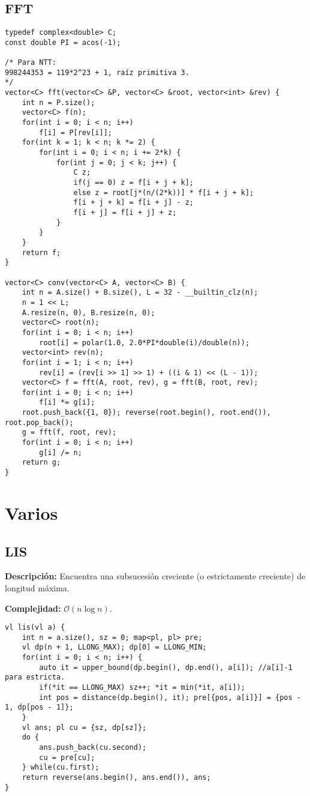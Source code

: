 \documentclass[twocolumn]{article}
\begin{document}
\subsection{FFT}
\lstset{basicstyle=\footnotesize\ttfamily,breaklines=true,tabsize=2,language=C++,frame=leftline, numbers=left, numberstyle=\tiny, numbersep=5pt}
\begin{lstlisting}
typedef complex<double> C;
const double PI = acos(-1);

/* Para NTT:
998244353 = 119*2^23 + 1, raíz primitiva 3.
*/
vector<C> fft(vector<C> &P, vector<C> &root, vector<int> &rev) {
	int n = P.size();
	vector<C> f(n);
	for(int i = 0; i < n; i++)
		f[i] = P[rev[i]];
	for(int k = 1; k < n; k *= 2) {
		for(int i = 0; i < n; i += 2*k) {
			for(int j = 0; j < k; j++) {
				C z;
				if(j == 0) z = f[i + j + k]; 
				else z = root[j*(n/(2*k))] * f[i + j + k];
				f[i + j + k] = f[i + j] - z;
				f[i + j] = f[i + j] + z;
			}
		}
	}
	return f;
}

vector<C> conv(vector<C> A, vector<C> B) {
	int n = A.size() + B.size(), L = 32 - __builtin_clz(n);
	n = 1 << L;
	A.resize(n, 0), B.resize(n, 0);
	vector<C> root(n);
	for(int i = 0; i < n; i++)
		root[i] = polar(1.0, 2.0*PI*double(i)/double(n));
	vector<int> rev(n);
	for(int i = 1; i < n; i++)
		rev[i] = (rev[i >> 1] >> 1) + ((i & 1) << (L - 1));
	vector<C> f = fft(A, root, rev), g = fft(B, root, rev);
	for(int i = 0; i < n; i++)
		f[i] *= g[i];
	root.push_back({1, 0}); reverse(root.begin(), root.end()), root.pop_back();
	g = fft(f, root, rev);
	for(int i = 0; i < n; i++)
		g[i] /= n;
	return g;
}

\end{lstlisting}
\section{Varios}
\subsection{LIS}
\begin{footnotesize}{\bf Descripción:} Encuentra una subsucesión creciente (o estrictamente creciente) de longitud máxima.


{\bf Complejidad:} $\mathcal{O}(n \log n)$.
\end{footnotesize}\lstset{basicstyle=\footnotesize\ttfamily,breaklines=true,tabsize=2,language=C++,frame=leftline, numbers=left, numberstyle=\tiny, numbersep=5pt}
\begin{lstlisting}
vl lis(vl a) {
	int n = a.size(), sz = 0; map<pl, pl> pre;
	vl dp(n + 1, LLONG_MAX); dp[0] = LLONG_MIN;
	for(int i = 0; i < n; i++) {
		auto it = upper_bound(dp.begin(), dp.end(), a[i]); //a[i]-1 para estricta.
		if(*it == LLONG_MAX) sz++; *it = min(*it, a[i]);
		int pos = distance(dp.begin(), it); pre[{pos, a[i]}] = {pos - 1, dp[pos - 1]};
	}
	vl ans; pl cu = {sz, dp[sz]};
	do {
		ans.push_back(cu.second);
		cu = pre[cu];
	} while(cu.first);
	return reverse(ans.begin(), ans.end()), ans;
}
\end{lstlisting}
\end{document}
